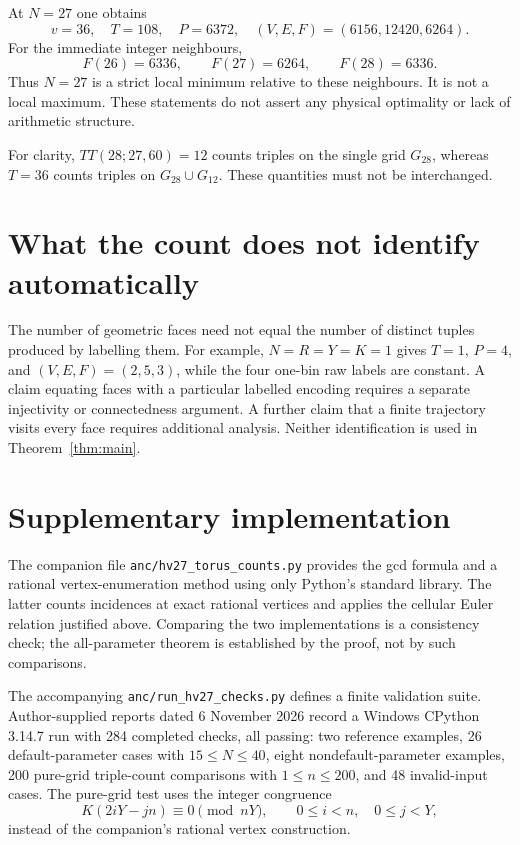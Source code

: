 \documentclass[a4paper,11pt]{article}
\begin{document}
At $N=27$ one obtains
\[
 v=36,\quad T=108,\quad P=6372,\quad
 (V,E,F)=(6156,12420,6264).
\]
For the immediate integer neighbours,
\[
 F(26)=6336,\qquad F(27)=6264,\qquad F(28)=6336.
\]
Thus $N=27$ is a strict local minimum relative to these neighbours.
It is not a local maximum. These statements do not assert any physical
optimality or lack of arithmetic structure.

For clarity, $TT(28;27,60)=12$ counts triples on the single grid $G_{28}$,
whereas $T=36$ counts triples on $G_{28}\cup G_{12}$. These quantities
must not be interchanged.

\section{What the count does not identify automatically}
The number of geometric faces need not equal the number of distinct
tuples produced by labelling them. For example, $N=R=Y=K=1$ gives
$T=1$, $P=4$, and $(V,E,F)=(2,5,3)$, while the four one-bin raw labels
are constant. A claim equating faces with a particular labelled encoding
requires a separate injectivity or connectedness argument. A further
claim that a finite trajectory visits every face requires additional
analysis. Neither identification is used in Theorem~\ref{thm:main}.

\section{Supplementary implementation}
The companion file \texttt{anc/hv27\_torus\_counts.py} provides the gcd
formula and a rational vertex-enumeration method using only Python's
standard library. The latter counts incidences at exact rational vertices
and applies the cellular Euler relation justified above. Comparing the
two implementations is a consistency check; the all-parameter theorem
is established by the proof, not by such comparisons.

The accompanying \texttt{anc/run\_hv27\_checks.py} defines a finite
validation suite. Author-supplied reports dated 6 November 2026 record a
Windows CPython 3.14.7 run with 284 completed checks, all passing: two
reference examples, 26 default-parameter cases with $15\leq N\leq40$,
eight nondefault-parameter examples, 200 pure-grid triple-count comparisons
with $1\leq n\leq200$, and 48 invalid-input cases. The pure-grid test uses
the integer congruence
\[
 K(2iY-jn)\equiv0\pmod{nY},\qquad 0\leq i<n,\quad 0\leq j<Y,
\]
instead of the companion's rational vertex construction.
\end{document}
